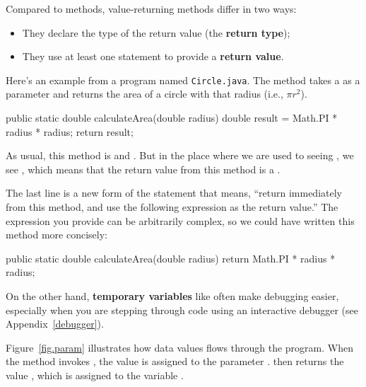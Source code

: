 
Compared to  methods, value-returning methods differ in two ways:


\begin{itemize}

\item They declare the type of the return value (the {\bf return type});

\item They use at least one  statement to provide a {\bf return value}.

\end{itemize}

Here's an example from a program named {\tt Circle.java}.
The  method takes a  as a parameter and returns the area of a circle with that radius (i.e., $\pi r^2$).

\begin{code}
public static double calculateArea(double radius) {
    double result = Math.PI * radius * radius;
    return result;
}
\end{code}

As usual, this method is  and .
But in the place where we are used to seeing , we see , which means that the return value from this method is a .


The last line is a new form of the  statement that means, ``return immediately from this method, and use the following expression as the return value.''
The expression you provide can be arbitrarily complex, so we could have written this method more concisely:

\begin{code}
public static double calculateArea(double radius) {
    return Math.PI * radius * radius;
}
\end{code}


On the other hand, {\bf temporary variables} like  often make debugging easier, especially when you are stepping through code using an interactive debugger (see Appendix~\ref{debugger}).

Figure~\ref{fig.param} illustrates how data values flows through the program.
When the  method invokes , the value  is assigned to the parameter .
 then returns the value , which is assigned to the variable .

